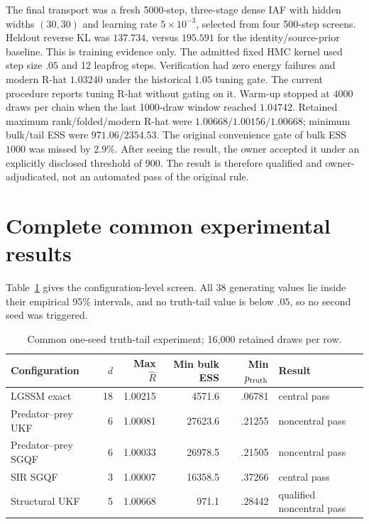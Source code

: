 The final transport was a fresh 5000-step, three-stage dense IAF with hidden
widths $(30,30)$ and learning rate $5\times10^{-3}$, selected from four
500-step screens.  Heldout reverse KL was $137.734$, versus $195.591$ for the
identity/source-prior baseline.  This is training evidence only.  The admitted
fixed HMC kernel used step size $.05$ and 12 leapfrog steps.  Verification had
zero energy failures and modern R-hat $1.03240$ under the historical $1.05$
tuning gate. The current procedure reports tuning R-hat without gating on it.
Warm-up stopped at $4000$ draws per chain when the last 1000-draw window reached
$1.04742$.  Retained maximum rank/folded/modern R-hat were
$1.00668/1.00156/1.00668$; minimum bulk/tail ESS were $971.06/2354.53$.
The original convenience gate of bulk ESS $1000$ was missed by $2.9\%$.
After seeing the result, the owner accepted it under an explicitly disclosed
threshold of $900$.  The result is therefore qualified and owner-adjudicated,
not an automated pass of the original rule.

\section{Complete common experimental results}

Table~\ref{tab:bf-neutra-common-summary} gives the configuration-level screen.
All 38 generating values lie inside their empirical 95\% intervals, and no
truth-tail value is below $.05$, so no second seed was triggered.

\begin{table}[htbp]
\centering\scriptsize
\setlength{\tabcolsep}{2.5pt}
\begin{tabular}{lrrrrl}
\toprule
Configuration & $d$ & Max $\widehat R$ & Min bulk ESS & Min $p_{\rm truth}$ & Result\\
\midrule
LGSSM exact &18&1.00215&4571.6&.06781&central pass\\
Predator--prey UKF &6&1.00081&27623.6&.21255&noncentral pass\\
Predator--prey SGQF&6&1.00033&26978.5&.21505&noncentral pass\\
SIR SGQF&3&1.00007&16358.5&.37266&central pass\\
Structural UKF&5&1.00668&971.1&.28442&qualified noncentral pass\\
\bottomrule
\end{tabular}
\caption{Common one-seed truth-tail experiment; 16,000 retained draws per row.}
\label{tab:bf-neutra-common-summary}
\end{table}

